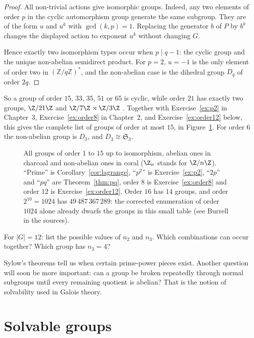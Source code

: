 \begin{proof}
All non-trivial actions give isomorphic groups.
Indeed, any two elements of order $p$
in the cyclic automorphism group generate
the same subgroup. They are of the form
$u$ and $u^k$ with $\gcd(k,p)=1$.
Replacing the generator $b$ of $P$
by $b^k$ changes the displayed action
to exponent $u^k$ without changing $G$.

Hence exactly two isomorphism types occur
when $p\mid q-1$: the cyclic group and
the unique non-abelian semidirect product.
For $p=2$, $u=-1$ is the only element
of order two in $(\mathbb Z/q\mathbb Z)^*$,
and the non-abelian case is the dihedral
group $D_q$ of order $2q$.
\end{proof}

So a group of order $15$, $33$, $35$, $51$ or $65$ is cyclic, while order $21$ has exactly two groups, $\Z/21\Z$ and $\Z/7\Z\rtimes\Z/3\Z$ . Together with Exercise~\ref{ex:p2} in Chapter~3, Exercise~\ref{ex:order8} in Chapter~2, and Exercise~\ref{ex:order12} below, this gives the complete list of groups of order at most $15$, in Figure~\ref{fig:small}. For order $6$ the non-abelian group is $D_3$, and $D_3\cong\mathfrak S_3$.

\begin{figure}[ht]
\centering
{}
\caption{All groups of order $1$ to $15$ up to isomorphism, abelian ones in charcoal and non-abelian ones in coral ($\Z_n$ stands for $\Z/n\Z$). ``Prime'' is Corollary~\ref{cor:lagrange}, ``$p^2$'' is Exercise~\ref{ex:p2}, ``$2p$'' and ``$pq$'' are Theorem~\ref{thm:pq}, order $8$ is Exercise~\ref{ex:order8} and order $12$ is Exercise~\ref{ex:order12}. Order $16$ has $14$ groups, and order $2^{10}=1024$ has $49\,487\,367\,289$: the corrected enumeration of order $1024$ alone already dwarfs the groups in this small table (see Burrell in the sources).}
\label{fig:small}
\end{figure}

\begin{think}
For $|G|=12$: list the possible values of $n_2$ and $n_3$. Which combinations can occur together? Which group has $n_3=4$?
\end{think}

Sylow's theorems tell us when certain prime-power pieces exist. Another question will soon be more important: can a group be broken repeatedly through normal subgroups until every remaining quotient is abelian? That is the notion of solvability used in Galois theory.

\section{Solvable groups}

